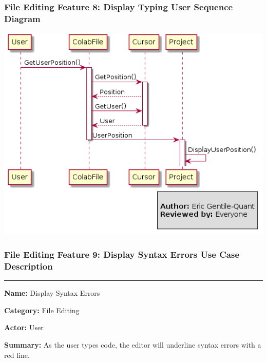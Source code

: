 \documentclass[twoside,letterpaper]{article}
\begin{document}
\subsubsection[File Editing Feature 8: Display Typing User Sequence Diagram]{\rmfamily\bfseries\color{black}
	File Editing Feature 8: Display Typing User Sequence Diagram}
\hypertarget{RefHeading22059017292}{}

\bigskip

\includegraphics[width=\textwidth]{images/SequenceDiagrams/UserPosition}

\newpage


\subsubsection[File Editing Feature 9: Display Syntax Errors]{\rmfamily\bfseries\color{black}
	File Editing Feature 9: Display Syntax Errors Use Case Description}
\hypertarget{RefHeading22059017292}{}

\vspace{2pt}
\hrule
\vspace{8pt}
	\noindent\textbf{Name:} Display Syntax Errors \newline
	
	\noindent\textbf{Category:} File Editing \newline
	
	\noindent\textbf{Actor:} User \newline
	
	\noindent\textbf{Summary:} As the user types code, the editor will underline syntax errors with a red line. \newline
	
\end{document}
